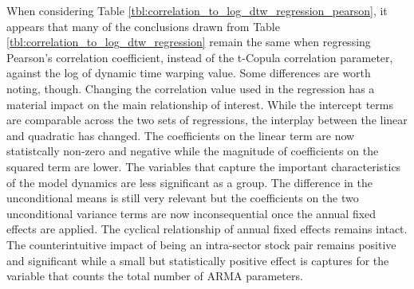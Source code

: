 \documentclass[12pt]{report}
\begin{document}
When considering Table \ref{tbl:correlation_to_log_dtw_regression_pearson}, it appears that many of the conclusions drawn from Table \ref{tbl:correlation_to_log_dtw_regression} remain the same when regressing Pearson's correlation coefficient, instead of the t-Copula correlation parameter, against the log of dynamic time warping value. Some differences are worth noting, though. Changing the correlation value used in the regression has a material impact on the main relationship of interest. While the intercept terms are comparable across the two sets of regressions, the interplay between the linear and quadratic has changed. The coefficients on the linear term are now statistcally non-zero and negative while the magnitude of coefficients on the squared term are lower. The variables that capture the important characteristics of the model dynamics are less significant as a group. The difference in the unconditional means is still very relevant but the coefficients on the two unconditional variance terms are now inconsequential once the annual fixed effects are applied. The cyclical relationship of annual fixed effects remains intact. The counterintuitive impact of being an intra-sector stock pair remains positive and significant while a small but statistically positive effect is captures for the variable that counts the total number of ARMA parameters.
\end{document}
